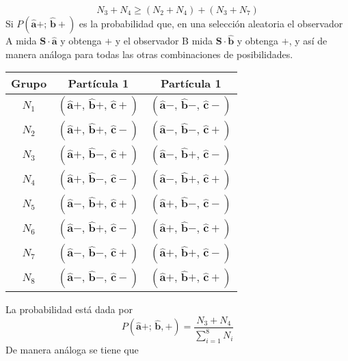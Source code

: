 \documentclass[a4paper]{article}
\begin{document}
\begin{equation}\label{eq::positivity_condition}
N_3 + N_4 \geq (N_2 +  N_4) + (N_3 +  N_7)
\end{equation} 
Si $P(\mathbf{\hat{a}}+;\,\mathbf{\hat{b}}+)$ es la probabilidad que, en una selección aleatoria el observador A mida $\mathbf{S}\cdot \mathbf{\hat{a}}$ y obtenga $+$ y el observador B mida $\mathbf{S}\cdot \mathbf{\hat{b}}$ y obtenga $+$, y así de manera análoga para todas las otras combinaciones de posibilidades.	
\begin{table}
\centering
\begin{tabular}{|c|c|c|}
\hline
\toprule
\textbf{Grupo} & \textbf{Partícula 1} & \textbf{Partícula 1} \\
\midrule
$N_1$ & $(\mathbf{\hat{a}}+,\, \mathbf{\hat{b}}+,\,\mathbf{\hat{c}}+)$ & $(\mathbf{\hat{a}}-,\, \mathbf{\hat{b}}-,\,\mathbf{\hat{c}}-)$\\
$N_2$ & $(\mathbf{\hat{a}}+,\, \mathbf{\hat{b}}+,\,\mathbf{\hat{c}}-)$ & $(\mathbf{\hat{a}}-,\, \mathbf{\hat{b}}-,\,\mathbf{\hat{c}}+)$\\
$N_3$ & $(\mathbf{\hat{a}}+,\, \mathbf{\hat{b}}-,\,\mathbf{\hat{c}}+)$ & $(\mathbf{\hat{a}}-,\, \mathbf{\hat{b}}+,\,\mathbf{\hat{c}}-)$\\
$N_4$ & $(\mathbf{\hat{a}}+,\, \mathbf{\hat{b}}-,\,\mathbf{\hat{c}}-)$ & $(\mathbf{\hat{a}}-,\, \mathbf{\hat{b}}+,\,\mathbf{\hat{c}}+)$\\
$N_5$ & $(\mathbf{\hat{a}}-,\, \mathbf{\hat{b}}+,\,\mathbf{\hat{c}}+)$ & $(\mathbf{\hat{a}}+,\, \mathbf{\hat{b}}-,\,\mathbf{\hat{c}}-)$\\
$N_6$ & $(\mathbf{\hat{a}}-,\, \mathbf{\hat{b}}+,\,\mathbf{\hat{c}}-)$ & $(\mathbf{\hat{a}}+,\, \mathbf{\hat{b}}-,\,\mathbf{\hat{c}}+)$\\
$N_7$ & $(\mathbf{\hat{a}}-,\, \mathbf{\hat{b}}-,\,\mathbf{\hat{c}}+)$ & $(\mathbf{\hat{a}}+,\, \mathbf{\hat{b}}+,\,\mathbf{\hat{c}}-)$\\
$N_8$ & $(\mathbf{\hat{a}}-,\, \mathbf{\hat{b}}-,\,\mathbf{\hat{c}}-)$ & $(\mathbf{\hat{a}}+,\, \mathbf{\hat{b}}+,\,\mathbf{\hat{c}}+)$\\
\bottomrule
\hline
\end{tabular}
    \label{tab:three_direction_correlations}
\end{table}
La probabilidad está dada por 
\begin{equation}
P(\mathbf{\hat{a}}+;\, \mathbf{\hat{b}},+) = \frac{N_3+N_4}{\sum_{i=1}^{8} N_i} 
\end{equation}
De manera análoga se tiene que 
\end{document}
